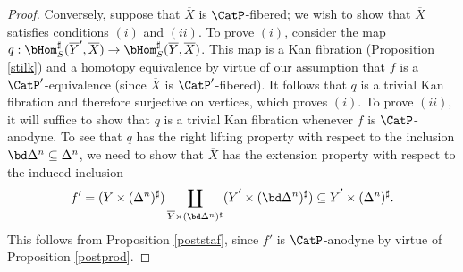 \begin{proof}
Conversely, suppose that $\overline{X}$ is $\CatP$-fibered; we wish to show that
$\overline{X}$ satisfies conditions $(i)$ and $(ii)$. To prove $(i)$, consider the map
$q: \bHom_{S}^{\sharp}( \overline{Y}', \overline{X} ) \rightarrow \bHom_{S}^{\sharp}( \overline{Y}, \overline{X} )$. This map is a Kan fibration (Proposition \ref{stilk}) and a homotopy equivalence
by virtue of our assumption that $f$ is a $\CatP'$-equivalence (since $\overline{X}$ is $\CatP'$-fibered).
It follows that $q$ is a trivial Kan fibration and therefore surjective on vertices, which proves $(i)$.
To prove $(ii)$, it will suffice to show that $q$ is a trivial Kan fibration whenever $f$
is $\CatP$-anodyne. To see that $q$ has the right lifting property with respect to the inclusion
$\bd \Delta^n \subseteq \Delta^n$, we need to show that $\overline{X}$ has the extension property with respect to the induced inclusion
$$f' = ( \overline{Y} \times (\Delta^n)^{\sharp} ) \coprod_{ \overline{Y} \times (\bd \Delta^n)^{\sharp}
} ( \overline{Y}' \times ( \bd \Delta^n)^{\sharp}) \subseteq \overline{Y}' \times (\Delta^n)^{\sharp}.$$
This follows from Proposition \ref{poststaf}, since $f'$ is $\CatP$-anodyne by virtue of
Proposition \ref{postprod}.
\end{proof}

